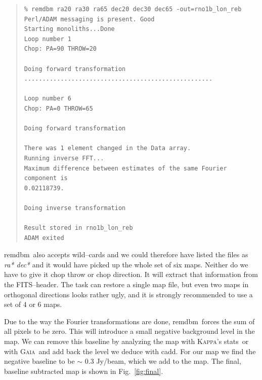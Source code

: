 \documentclass[twoside,11pt]{article}
\newenvironment{myquote}{\begin{quote}\begin{small}}{\end{small}\end{quote}}
\newcommand{\Kappa}{\xref{\textsc{Kappa}}{sun95}{}}
\newcommand{\gaia}{\xref{\textsc{Gaia}}{sun214}{}}
\newcommand{\task}[1]{\textsf{#1}}
\newcommand{\remdbm}{\xref{\task{remdbm}}{sun216}{REMDBM}}
\newcommand{\stats}{\xref{\task{stats}}{sun95}{STATS}}
\newcommand{\cadd}{\xref{\task{cadd}}{sun95}{CADD}}
\newcommand{\xref}[3]{#1}
\renewcommand{\_}{\texttt{\symbol{95}}}
\begin{document}
\begin{myquote}
\begin{verbatim}
% remdbm ra20 ra30 ra65 dec20 dec30 dec65 -out=rno1b_lon_reb
Perl/ADAM messaging is present. Good
Starting monoliths...Done
Loop number 1
Chop: PA=90 THROW=20

Doing forward transformation
....................................................

Loop number 6
Chop: PA=0 THROW=65

Doing forward transformation

There was 1 element changed in the Data array.
Running inverse FFT...
Maximum difference between estimates of the same Fourier component is
0.02118739.

Doing inverse transformation

Result stored in rno1b_lon_reb
ADAM exited

\end{verbatim}
\end{myquote}

\remdbm\ also accepts wild--cards and we could therefore have listed
the files as {\it ra* dec*} and it would have picked up the whole set
of six maps.  Neither do we have to give it chop throw or chop
direction.  It will extract that information from the FITS--header. 
The task can restore a single map file, but even two maps in
orthogonal directions looks rather ugly, and it is strongly
recommended to use a set of 4 or 6 maps.


Due to the way the Fourier transformations are done, \remdbm\ forces
the sum of all pixels to be zero.  This will introduce a small
negative background level in the map.  We can remove this baseline by
analyzing the map with \Kappa's \stats\ or with \gaia\ and add back
the level we deduce with \cadd.  For our map we find the negative
baseline to be $\sim$ 0.3 Jy/beam, which we add to the map.  The
final, baseline subtracted map is shown in Fig.\ \ref{fig:final}.
\end{document}
